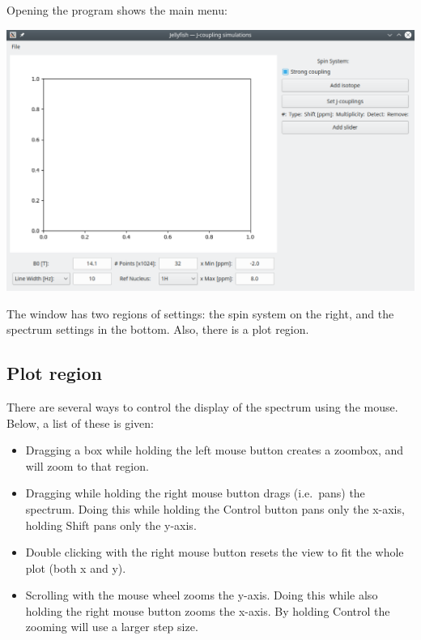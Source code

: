 \documentclass[11pt,a4paper]{article}
\begin{document}
Opening the program shows the main menu:
\begin{center}
\includegraphics[width=0.8\linewidth]{Images/Interface1.png}
\end{center}

The window has two regions of settings: the spin system on the right, and the spectrum settings in
the bottom. Also, there is a plot region.

\subsection{Plot region}
There are several ways to control the display of the spectrum 
using the mouse. Below, a list of these is given:

\begin{itemize}
\item Dragging a box while holding the left mouse button creates a zoombox, 
  and will zoom to that region.
\item Dragging while holding the right mouse button drags (i.e.\ pans) the spectrum.
  Doing this while holding the Control button pans only the x-axis, holding Shift pans only the y-axis.
\item Double clicking with the right mouse button resets the view to fit the whole plot (both x and y).
\item Scrolling with the mouse wheel zooms the y-axis. Doing this while also holding the right mouse 
  button zooms the x-axis. By holding Control the zooming will use a larger step size.
\end{itemize}
\end{document}
